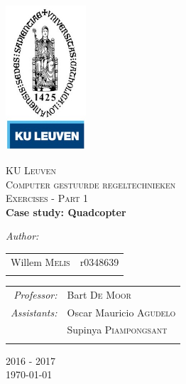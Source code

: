\begin{titlepage}
\begin{center}

\includegraphics[width=3cm]{kuleuven.jpg}~\\[1cm]
\vfill


\textsc{\LARGE KU Leuven}\\[0.7cm]

\textsc{\Large Computer gestuurde regeltechnieken}\\[0.7cm]
\textsc{\Large Exercises - Part 1 }\\[0.7cm]



\centering \huge \bfseries Case study: Quadcopter

\end{center}

\vfill

\begin{center}
\emph{Author:} \\[.2cm]
\begin{tabular}[h]{rl}
Willem \textsc{Melis} & r0348639\\
\phantom{------------------------} & \phantom{------------------------}\\
\end{tabular}
\end{center}

\vfill

\begin{center}
\begin{tabular}[h]{rl}
\emph{Professor:} & Bart \textsc{De Moor} \\
\emph{Assistants:}&  
Oscar Mauricio  \textsc{Agudelo} \\
&  Supinya  \textsc{Piampongsant} \\
\phantom{------------------------} & \phantom{------------------------}\\
\end{tabular}
\end{center}

\vfill
\vfill
\vfill

\begin{center} 
2016 - 2017 \\[.5cm]
{\Large \today}
\end{center}

\end{titlepage}
